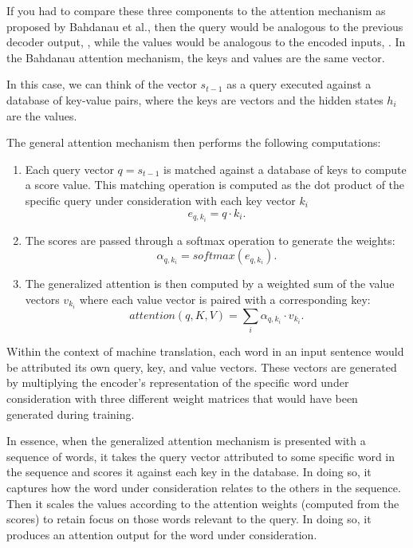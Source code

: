 \documentclass[10pt,a4paper]{article}
\begin{document}
	If you had to compare these three components to the attention mechanism as proposed by Bahdanau et al., then the query would be analogous to the previous decoder output, 
	, while the values would be analogous to the encoded inputs, 
	. In the Bahdanau attention mechanism, the keys and values are the same vector.
	
	In this case, we can think of the vector $s_{t-1}$
	as a query executed against a database of key-value pairs, where the keys are vectors and the hidden states $h_{i}$
	are the values.
	
	
The general attention mechanism then performs the following computations:

\begin{enumerate}
\item Each query vector $q = s_{t-1}$ is matched against a database of keys to compute a score value. This matching operation is computed as the dot product of the specific query under consideration with each key vector $k_{i}$
\begin{equation}
	e_{q, k_{i}} = q \cdot k_{i}.
\end{equation} 

\item The scores are passed through a softmax operation to generate the weights:
\begin{equation}
	\alpha_{q, k_{i}} = softmax(e_{q, k_{i}}).
\end{equation}

\item The generalized attention is then computed by a weighted sum of the value vectors $v_{k_{i}}$ where each value vector is paired with a corresponding key:
\begin{equation}
	attention(q, K, V) = \sum_{i} \alpha_{q, k_{i}} \cdot v_{k_{i}}.
\end{equation}

\end{enumerate}

Within the context of machine translation, each word in an input sentence would be attributed its own query, key, and value vectors. These vectors are generated by multiplying the encoder’s representation of the specific word under consideration with three different weight matrices that would have been generated during training. 

In essence, when the generalized attention mechanism is presented with a sequence of words, it takes the query vector attributed to some specific word in the sequence and scores it against each key in the database. In doing so, it captures how the word under consideration relates to the others in the sequence. Then it scales the values according to the attention weights (computed from the scores) to retain focus on those words relevant to the query. In doing so, it produces an attention output for the word under consideration. 
\end{document}
